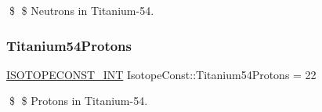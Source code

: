 \$ \$ Neutrons in Titanium-\/54. \mbox{\label{group___isotope_const-_titanium-_ti54_ga7ed1d41c0fe3f399ef75630b21bfe61b}} 
\subsubsection{\texorpdfstring{Titanium54\+Protons}{Titanium54Protons}}
{\footnotesize\ttfamily \mbox{\hyperlink{group___isotope_const-_macros_ga5f18360b3e99483a35c32d789e62621c}{I\+S\+O\+T\+O\+P\+E\+C\+O\+N\+S\+T\+\_\+\+I\+NT}} Isotope\+Const\+::\+Titanium54\+Protons = 22}

\$ \$ Protons in Titanium-\/54. 